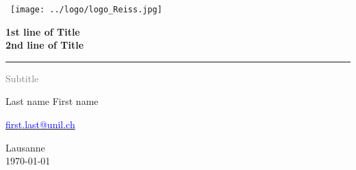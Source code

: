 
\begin{titlepage}
\begin{singlespace}

\begin{center}
\hbox{\hspace{-3cm} \texttt{[image: ../logo/logo\_Reiss.jpg]}}
\end{center}
\vspace*{1cm}

\Huge %
\textbf{1st line of Title\\ 2nd line of Title}\\
\rule{5cm}{0.2pt}

\LARGE
\textcolor{gray}{
Subtitle\\
}
\vspace{2cm}

Last name First name

\large

\href{mailto:first.last@unil.ch}{\textcolor{blue}{first.last@unil.ch}}

\vfill


Lausanne\\
\today

\end{singlespace}
\end{titlepage}
\restoregeometry